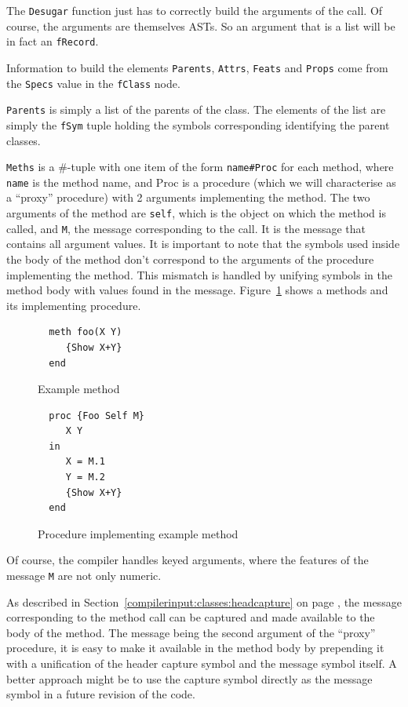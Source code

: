 \documentclass[a4paper]{memoir}
\begin{document}
The \lstinline!Desugar! function just has to correctly build the arguments of
the call. Of course, the arguments are themselves ASTs. So an argument that is a
list will be in fact an \lstinline!fRecord!.

Information to build the elements \lstinline!Parents!, \lstinline!Attrs!,
\lstinline!Feats! and \lstinline!Props! come from the \lstinline!Specs! value in
the \lstinline!fClass! node.

\lstinline!Parents! is simply a list of the parents of the class. The elements
of the list are simply the \lstinline!fSym! tuple holding the symbols
corresponding identifying the parent classes.


\lstinline!Meths! is a \#-tuple with one item of the form \lstinline!name#Proc! for each
method, where \lstinline!name! is the method name, and Proc is a procedure
(which we will characterise as a ``proxy'' procedure) with
2 arguments implementing the method. The two arguments of the method are
\lstinline!self!,
which is the object on which the method is called, and \lstinline!M!, the message
corresponding to the call. It is the message that contains all argument values.
It is important to note that the symbols used inside the body of the method
don't correspond to the arguments of the procedure implementing the method.
This mismatch is handled by unifying symbols in the method body with values
found in the message. Figure~\ref{fig:methimpl} shows a methods and its implementing procedure.
\begin{figure}[h]
\begin{lstlisting}
  meth foo(X Y)
     {Show X+Y}
  end 
\end{lstlisting}
\caption{Example method}
\begin{lstlisting}
  proc {Foo Self M}
     X Y
  in
     X = M.1
     Y = M.2
     {Show X+Y}
  end  
\end{lstlisting}
\caption{Procedure implementing example method}
\label{fig:methimpl}
\end{figure}

Of course, the compiler handles keyed arguments, where the features of the
message \lstinline!M! are not only numeric.

As described in Section~\ref{compilerinput:classes:headcapture} on page \pageref{compilerinput:classes:headcapture}, the message
corresponding to the method call can be captured and made available to the body of the
method. The message being the second argument of the ``proxy'' procedure, it is
easy to make it available in the method body by prepending it with a unification
of the header capture symbol and the message symbol itself. A better approach
might be to use the capture symbol directly as the message symbol in a future
revision of the code.
\end{document}
